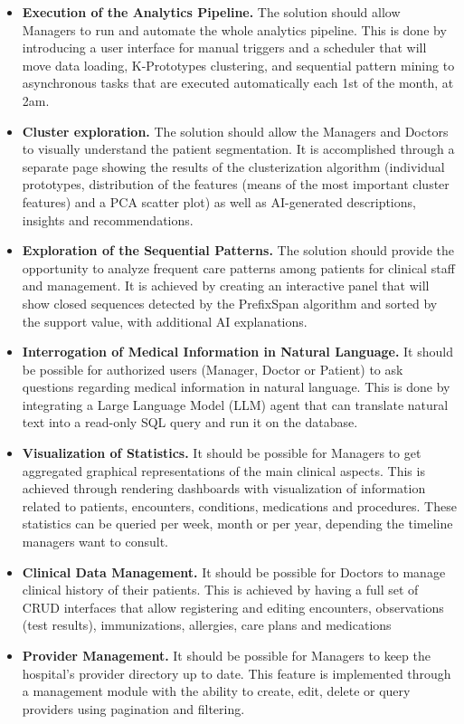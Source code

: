 \begin{itemize}
\item \textbf{Execution of the Analytics Pipeline.} The solution should allow Managers to run and automate the whole analytics pipeline. This is done by introducing a user interface for manual triggers and a scheduler that will move data loading, K-Prototypes clustering, and sequential pattern mining to asynchronous tasks that are executed automatically each 1st of the month, at 2am.
    \item \textbf{Cluster exploration.} The solution should allow the Managers and Doctors to visually understand the patient segmentation. It is accomplished through a separate page showing the results of the clusterization algorithm (individual prototypes, distribution of the features (means of the most important cluster features) and a PCA scatter plot) as well as AI-generated descriptions, insights and recommendations.
    \item \textbf{Exploration of the Sequential Patterns.} The solution should provide the opportunity to analyze frequent care patterns among patients for clinical staff and management. It is achieved by creating an interactive panel that will show closed sequences detected by the PrefixSpan algorithm and sorted by the support value, with additional AI explanations.
    \item \textbf{Interrogation of Medical Information in Natural Language.} It should be possible for authorized users (Manager, Doctor or Patient) to ask questions regarding medical information in natural language. This is done by integrating a Large Language Model (LLM) agent that can translate natural text into a read-only SQL query and run it on the database.
    \item \textbf{Visualization of Statistics.} It should be possible for Managers to get aggregated graphical representations of the main clinical aspects. This is achieved through rendering dashboards with visualization of information related to patients, encounters, conditions, medications and procedures. These statistics can be queried per week, month or per year, depending the timeline managers want to consult.
    \item \textbf{Clinical Data Management.} It should be possible for Doctors to manage clinical history of their patients. This is achieved by having a full set of CRUD interfaces that allow registering and editing encounters, observations (test results), immunizations, allergies, care plans and medications
    \item \textbf{Provider Management.} It should be possible for Managers to keep the hospital's provider directory up to date. This feature is implemented through a management module with the ability to create, edit, delete or query providers using pagination and filtering.
\end{itemize}

